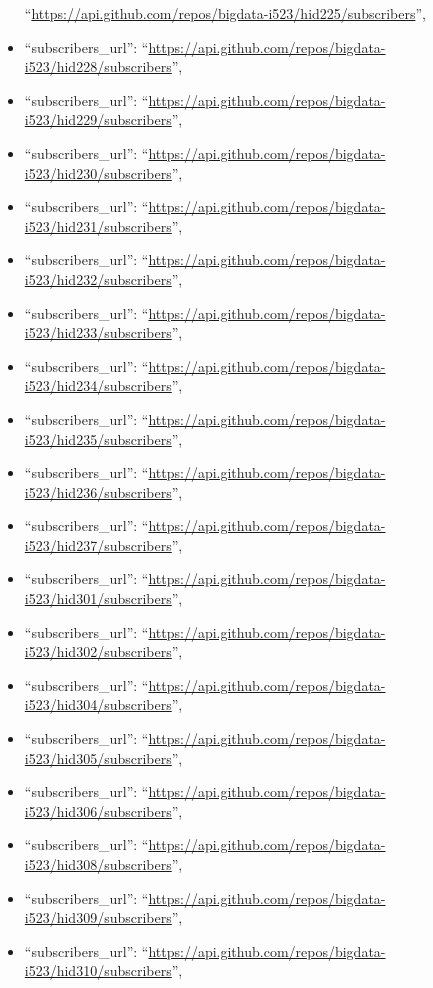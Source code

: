 \begin{itemize}
  ``\url{https://api.github.com/repos/bigdata-i523/hid225/subscribers}'',
\item
  ``subscribers\_url'':
  ``\url{https://api.github.com/repos/bigdata-i523/hid228/subscribers}'',
\item
  ``subscribers\_url'':
  ``\url{https://api.github.com/repos/bigdata-i523/hid229/subscribers}'',
\item
  ``subscribers\_url'':
  ``\url{https://api.github.com/repos/bigdata-i523/hid230/subscribers}'',
\item
  ``subscribers\_url'':
  ``\url{https://api.github.com/repos/bigdata-i523/hid231/subscribers}'',
\item
  ``subscribers\_url'':
  ``\url{https://api.github.com/repos/bigdata-i523/hid232/subscribers}'',
\item
  ``subscribers\_url'':
  ``\url{https://api.github.com/repos/bigdata-i523/hid233/subscribers}'',
\item
  ``subscribers\_url'':
  ``\url{https://api.github.com/repos/bigdata-i523/hid234/subscribers}'',
\item
  ``subscribers\_url'':
  ``\url{https://api.github.com/repos/bigdata-i523/hid235/subscribers}'',
\item
  ``subscribers\_url'':
  ``\url{https://api.github.com/repos/bigdata-i523/hid236/subscribers}'',
\item
  ``subscribers\_url'':
  ``\url{https://api.github.com/repos/bigdata-i523/hid237/subscribers}'',
\item
  ``subscribers\_url'':
  ``\url{https://api.github.com/repos/bigdata-i523/hid301/subscribers}'',
\item
  ``subscribers\_url'':
  ``\url{https://api.github.com/repos/bigdata-i523/hid302/subscribers}'',
\item
  ``subscribers\_url'':
  ``\url{https://api.github.com/repos/bigdata-i523/hid304/subscribers}'',
\item
  ``subscribers\_url'':
  ``\url{https://api.github.com/repos/bigdata-i523/hid305/subscribers}'',
\item
  ``subscribers\_url'':
  ``\url{https://api.github.com/repos/bigdata-i523/hid306/subscribers}'',
\item
  ``subscribers\_url'':
  ``\url{https://api.github.com/repos/bigdata-i523/hid308/subscribers}'',
\item
  ``subscribers\_url'':
  ``\url{https://api.github.com/repos/bigdata-i523/hid309/subscribers}'',
\item
  ``subscribers\_url'':
  ``\url{https://api.github.com/repos/bigdata-i523/hid310/subscribers}'',

\end{itemize}
